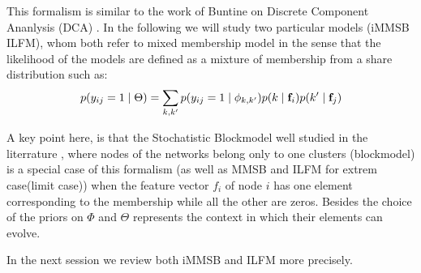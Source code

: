 This formalism is similar to the work of Buntine on Discrete Component Ananlysis (DCA) \cite{DCA}. In the following we will study two particular models (iMMSB ILFM), whom both refer to mixed membership model in the sense that the likelihood of the models are defined as a mixture of membership from a share distribution such as:
\begin{equation}
p(y_{ij}=1 \mid \Theta ) = \sum_{k, k'} p(y_{ij}=1\mid\phi_{k,k'}) p(k \mid \mathbf{f}_i) p(k' \mid \mathbf{f}_j)
\end{equation}

A key point here, is that the Stochatistic Blockmodel well studied in the literrature \cite{goldenberg2010survey}, where nodes of the networks belong only to one clusters (blockmodel) is a special case of this formalism (as well as MMSB and ILFM for extrem case(limit case)) when the feature vector $f_i$ of node $i$ has one element corresponding to the membership while all the other are zeros. Besides the choice of the priors on $\Phi$ and $\Theta$ represents the context in which  their elements can evolve.

In the next session we review both iMMSB and ILFM more precisely.

